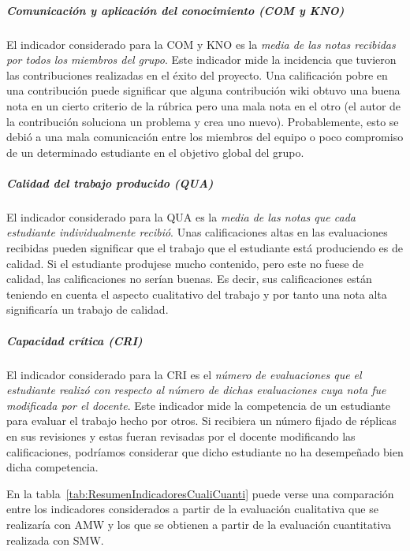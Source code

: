 			\subparagraph*{Comunicación y aplicación del conocimiento (COM y KNO)}
			El indicador considerado para la COM y KNO es la \emph{media de las notas recibidas por todos los miembros del grupo}. Este indicador mide la incidencia que tuvieron las contribuciones realizadas en el éxito del proyecto. Una calificación pobre en una contribución puede significar  que alguna contribución wiki obtuvo una buena nota en un cierto criterio de la rúbrica pero una mala nota en el otro (el autor de la contribución soluciona un problema y crea uno nuevo). Probablemente, esto se debió a una mala comunicación entre los miembros del equipo o poco compromiso de un determinado estudiante en el objetivo global del grupo. 

			\subparagraph*{Calidad del trabajo producido (QUA)}
			El indicador considerado para la QUA es la \emph{media de las notas que cada estudiante individualmente recibió}. Unas calificaciones altas en las evaluaciones recibidas pueden significar que el trabajo que el estudiante está produciendo es de calidad. Si el estudiante produjese mucho contenido, pero este no fuese de calidad, las calificaciones no serían buenas. Es decir, sus calificaciones están teniendo en cuenta el aspecto cualitativo del trabajo y por tanto una nota alta significaría un trabajo de calidad.

			\subparagraph*{Capacidad crítica (CRI)}
			El indicador considerado para la CRI es el \emph{número de evaluaciones que el estudiante realizó con respecto al número de dichas evaluaciones cuya nota fue modificada por el docente}. Este indicador mide la competencia de un estudiante para evaluar el trabajo hecho por otros. Si recibiera un número fijado de réplicas en sus revisiones y estas fueran revisadas por el docente modificando las calificaciones, podríamos considerar que dicho estudiante no ha desempeñado bien dicha competencia.

			En la tabla~\ref{tab:ResumenIndicadoresCualiCuanti} puede verse una comparación entre los indicadores considerados a partir de la evaluación cualitativa que se realizaría con AMW y los que se obtienen a partir de la evaluación cuantitativa realizada con SMW.

